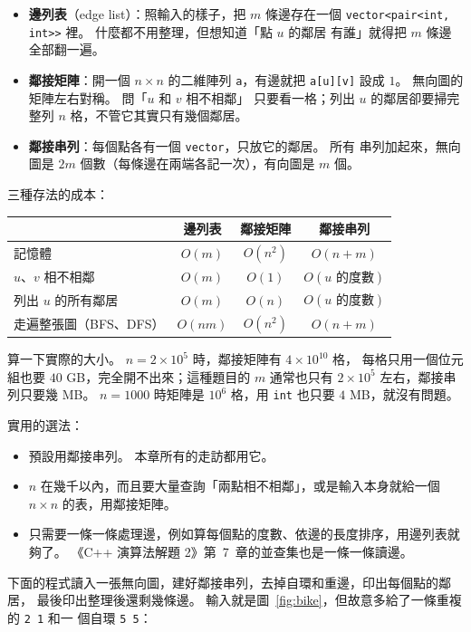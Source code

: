 \begin{itemize}
\item \textbf{邊列表}（edge list）：照輸入的樣子，把 $m$ 條邊存在一個
\texttt{vector<pair<int, int>>} 裡。 什麼都不用整理，但想知道「點 $u$ 的鄰居
有誰」就得把 $m$ 條邊全部翻一遍。
\item \textbf{鄰接矩陣}：開一個 $n \times n$ 的二維陣列 \texttt{a}，有邊就把
\texttt{a[u][v]} 設成 $1$。 無向圖的矩陣左右對稱。 問「$u$ 和 $v$ 相不相鄰」
只要看一格；列出 $u$ 的鄰居卻要掃完整列 $n$ 格，不管它其實只有幾個鄰居。
\item \textbf{鄰接串列}：每個點各有一個 \texttt{vector}，只放它的鄰居。 所有
串列加起來，無向圖是 $2m$ 個數（每條邊在兩端各記一次），有向圖是 $m$ 個。
\end{itemize}

三種存法的成本：

\begin{center}
\begin{tabular}{lccc}
\toprule
 & 邊列表 & 鄰接矩陣 & 鄰接串列 \\
\midrule
記憶體 & $O(m)$ & $O(n^2)$ & $O(n + m)$ \\
$u$、$v$ 相不相鄰 & $O(m)$ & $O(1)$ & $O(u \text{ 的度數})$ \\
列出 $u$ 的所有鄰居 & $O(m)$ & $O(n)$ & $O(u \text{ 的度數})$ \\
走遍整張圖（BFS、DFS）& $O(nm)$ & $O(n^2)$ & $O(n + m)$ \\
\bottomrule
\end{tabular}
\end{center}

算一下實際的大小。 $n = 2 \times 10^5$ 時，鄰接矩陣有 $4 \times 10^{10}$ 格，
每格只用一個位元組也要 $40$ GB，完全開不出來；這種題目的 $m$ 通常也只有
$2 \times 10^5$ 左右，鄰接串列只要幾 MB。 $n = 1000$ 時矩陣是 $10^6$ 格，用
\texttt{int} 也只要 $4$ MB，就沒有問題。

實用的選法：

\begin{itemize}
\item 預設用鄰接串列。 本章所有的走訪都用它。
\item $n$ 在幾千以內，而且要大量查詢「兩點相不相鄰」，或是輸入本身就給一個
$n \times n$ 的表，用鄰接矩陣。
\item 只需要一條一條處理邊，例如算每個點的度數、依邊的長度排序，用邊列表就
夠了。 《C++ 演算法解題 2》第~7~章的並查集也是一條一條讀邊。
\end{itemize}

下面的程式讀入一張無向圖，建好鄰接串列，去掉自環和重邊，印出每個點的鄰居，
最後印出整理後還剩幾條邊。 輸入就是圖~\ref{fig:bike}，但故意多給了一條重複的 \texttt{2 1} 和一
個自環 \texttt{5 5}：

